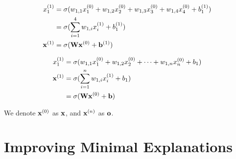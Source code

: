 \documentclass[12pt]{article}
\begin{document}
\begin{align*}
	x_1^{(1)} &= \sigma(w_{1,1} x_1^{(0)} + w_{1,2} x_2^{(0)} + w_{1,3} x_3^{(0)} + w_{1,4} x_4^{(0)} + b_1^{(1)}) \\
	&= \sigma(\sum_{i=1}^{4}{w_{1,i} x_i^{(1)}} + b_1^{(1)}) \\
	\vb{x}^{(1)} &= \sigma(\vb{W}\vb{x}^{(0)} + \vb{b}^{(1)})
\end{align*}

\begin{align*}
	x_1^{(1)} &= \sigma(w_{1,1} x_1^{(0)} + w_{1,2} x_2^{(0)} + \dots + w_{1,n} x_n^{(0)} + b_1) \\
	\vb{x}^{(1)} &= \sigma(\sum_{i=1}^{n}{w_{1,i} x_i^{(1)}} + b_1) \\
	       &= \sigma(\vb{W}\vb{x}^{(0)} + \vb{b})
\end{align*}

We denote $\vb{x}^{(0)}$ as $\vb{x}$, and $\vb{x}^{(n)}$ as $\vb{o}$.




\section{Improving Minimal Explanations}
\end{document}
